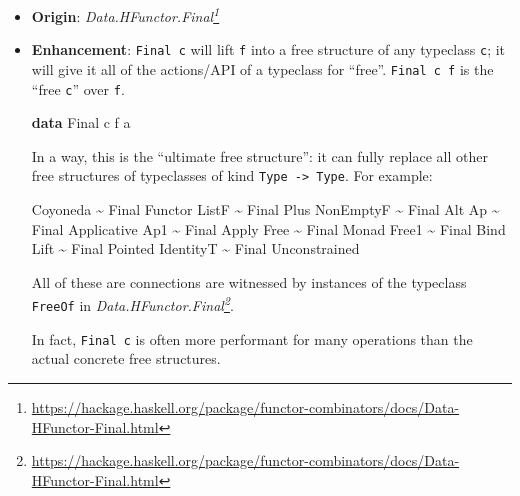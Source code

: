 \documentclass[]{article}
\newenvironment{Shaded}{}{}
\newcommand{\DataTypeTok}[1]{\textcolor[rgb]{0.56,0.13,0.00}{#1}}
\newcommand{\KeywordTok}[1]{\textcolor[rgb]{0.00,0.44,0.13}{\textbf{#1}}}
\newcommand{\NormalTok}[1]{#1}
\newcommand{\OperatorTok}[1]{\textcolor[rgb]{0.40,0.40,0.40}{#1}}
\renewcommand{\href}[2]{#2\footnote{\url{#1}}}
\begin{document}
\begin{itemize}
\item
  \textbf{Origin}:
  \emph{\href{https://hackage.haskell.org/package/functor-combinators/docs/Data-HFunctor-Final.html}{Data.HFunctor.Final}}
\item
  \textbf{Enhancement}: \texttt{Final\ c} will lift \texttt{f} into a free
  structure of any typeclass \texttt{c}; it will give it all of the actions/API
  of a typeclass for ``free''. \texttt{Final\ c\ f} is the ``free \texttt{c}''
  over \texttt{f}.

\begin{Shaded}
\begin{Highlighting}[]
\KeywordTok{data} \DataTypeTok{Final}\NormalTok{ c f a}
\end{Highlighting}
\end{Shaded}

  In a way, this is the ``ultimate free structure'': it can fully replace all
  other free structures of typeclasses of kind
  \texttt{Type\ -\textgreater{}\ Type}. For example:

\begin{Shaded}
\begin{Highlighting}[]
\DataTypeTok{Coyoneda}  \OperatorTok{\textasciitilde{}} \DataTypeTok{Final} \DataTypeTok{Functor}
\DataTypeTok{ListF}     \OperatorTok{\textasciitilde{}} \DataTypeTok{Final} \DataTypeTok{Plus}
\DataTypeTok{NonEmptyF} \OperatorTok{\textasciitilde{}} \DataTypeTok{Final} \DataTypeTok{Alt}
\DataTypeTok{Ap}        \OperatorTok{\textasciitilde{}} \DataTypeTok{Final} \DataTypeTok{Applicative}
\DataTypeTok{Ap1}       \OperatorTok{\textasciitilde{}} \DataTypeTok{Final} \DataTypeTok{Apply}
\DataTypeTok{Free}      \OperatorTok{\textasciitilde{}} \DataTypeTok{Final} \DataTypeTok{Monad}
\DataTypeTok{Free1}     \OperatorTok{\textasciitilde{}} \DataTypeTok{Final} \DataTypeTok{Bind}
\DataTypeTok{Lift}      \OperatorTok{\textasciitilde{}} \DataTypeTok{Final} \DataTypeTok{Pointed}
\DataTypeTok{IdentityT} \OperatorTok{\textasciitilde{}} \DataTypeTok{Final} \DataTypeTok{Unconstrained}
\end{Highlighting}
\end{Shaded}

  All of these are connections are witnessed by instances of the typeclass
  \texttt{FreeOf} in
  \emph{\href{https://hackage.haskell.org/package/functor-combinators/docs/Data-HFunctor-Final.html}{Data.HFunctor.Final}}.

  In fact, \texttt{Final\ c} is often more performant for many operations than
  the actual concrete free structures.


\end{itemize}
\end{document}
